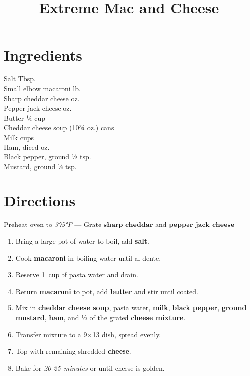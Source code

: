 \documentclass[11pt,letterpaper]{article}
\title{Extreme Mac and Cheese}
\author{}
\date{}
\begin{document}
\maketitle
\thispagestyle{empty}

\section*{Ingredients}
\setlength{\columnsep}{20pt}
\begin{multicols}{2}
\noindent
    Salt  Tbsp. \\
    Small elbow macaroni  lb. \\
    Sharp cheddar cheese  oz. \\
    Pepper jack cheese  oz. \\
    Butter \dotfill ¼ cup \\
    Cheddar cheese soup  (10¾ oz.) cans \\
    \columnbreak
    Milk  cups \\
    Ham, diced  oz. \\
    Black pepper, ground \dotfill ½ tsp. \\
    Mustard, ground \dotfill ½ tsp. \\
\end{multicols}

\section*{Directions}

\noindent
Preheat oven to \textit{375°F} ---
Grate \textbf{sharp cheddar} and \textbf{pepper jack cheese}

\begin{enumerate}
    \item Bring a large pot of water to boil, add \textbf{salt}.
    
    \item Cook \textbf{macaroni} in boiling water until al-dente.
    
    \item Reserve 1~cup of pasta water and drain.
    
    \item Return \textbf{macaroni} to pot, add \textbf{butter} and stir until coated.
    
    \item Mix in \textbf{cheddar cheese soup}, pasta water, \textbf{milk}, \textbf{black pepper}, \textbf{ground mustard}, \textbf{ham}, and ½ of the grated \textbf{cheese mixture}.
    
    \item Transfer mixture to a 9×13 dish, spread evenly.
    
    \item Top with remaining shredded \textbf{cheese}.
    
    \item Bake for \textit{20-25~minutes} or until cheese is golden.
\end{enumerate}
\end{document}
